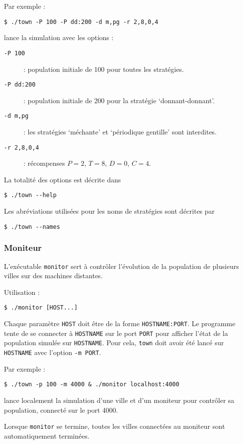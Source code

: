 \documentclass[10pt]{article}
\begin{document}
Par exemple :
\begin{verbatim}
$ ./town -P 100 -P dd:200 -d m,pg -r 2,8,0,4
\end{verbatim}
lance la simulation avec les options :
\begin{description}
\item[\tt{-P 100}] : population initiale de 100 pour toutes les stratégies.
\item[\tt{-P dd:200}] : population initiale de 200 pour la stratégie `donnant-donnant'.
\item[\tt{-d m,pg}] : les stratégies `méchante' et `périodique gentille' sont interdites.
\item[\tt{-r 2,8,0,4}] : récompenses $P=2$, $T=8$, $D=0$, $C=4$.
\end{description}

La totalité des options est décrite dans
\begin{verbatim}
$ ./town --help
\end{verbatim}

Les abréviations utilisées pour les noms de stratégies sont décrites par
\begin{verbatim}
$ ./town --names
\end{verbatim}

\subsubsection{Moniteur}
L'exécutable \verb|monitor| sert à contrôler l'évolution de la population de plusieurs villes sur des machines distantes.

Utilisation :
\begin{verbatim}
$ ./monitor [HOST...]
\end{verbatim}
Chaque paramètre \verb|HOST| doit être de la forme \verb|HOSTNAME:PORT|.
Le programme tente de se connecter à \verb|HOSTNAME| sur le port \verb|PORT| pour afficher l'état de la population simulée sur \verb|HOSTNAME|.
Pour cela, \verb|town| doit avoir été lancé sur \verb|HOSTNAME| avec l'option \verb|-m PORT|.

Par exemple :
\begin{verbatim}
$ ./town -p 100 -m 4000 & ./monitor localhost:4000
\end{verbatim}
lance localement la simulation d'une ville et d'un moniteur pour contrôler sa population, connecté sur le port 4000.

Lorsque \verb|monitor| se termine, toutes les villes connectées au moniteur sont automatiquement terminées.
\end{document}
